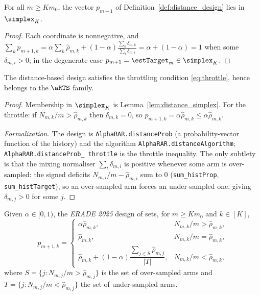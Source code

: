 \begin{lemma}\label{lem:distance_simplex}
\leanok
{}
For all $m \ge K m_0$, the vector $p_{m+1}$ of Definition~\ref{def:distance_design}
lies in $\simplex_K$.
\end{lemma}

\begin{proof}\leanok
Each coordinate is nonnegative, and
$\sum_k p_{m+1,k} = \alpha \sum_k \hat{\rho}_{m,k}
 + (1-\alpha)\frac{\sum_k \delta_{m,k}}{\sum_i \delta_{m,i}} = \alpha + (1-\alpha) = 1$
when some $\delta_{m,i}>0$; in the degenerate case $p_{m+1}=\estTarget_m \in \simplex_K$.
\end{proof}

\begin{lemma}\label{lem:distance_isARTS}
\leanok
{}
The distance-based design satisfies the throttling condition \eqref{eq:throttle},
hence belongs to the $\aRTS$ family.
\end{lemma}

\begin{proof}\leanok
{}
Membership in $\simplex_K$ is Lemma~\ref{lem:distance_simplex}. For the throttle:
if $N_{m,k}/m > \hat{\rho}_{m,k}$ then $\delta_{m,k} = 0$, so
$p_{m+1,k} = \alpha\hat{\rho}_{m,k} \le \alpha \hat{\rho}_{m,k}$.

\emph{Formalization.} The design is \texttt{AlphaRAR.distanceProb} (a probability-vector function of
the history) and the algorithm \texttt{AlphaRAR.distanceAlgorithm}; \texttt{AlphaRAR.distanceProb\_%
throttle} is the throttle inequality. The only subtlety is that the mixing normaliser $\sum_i
\delta_{m,i}$ is positive whenever some arm is over-sampled: the signed deficits
$N_{m,i}/m - \hat\rho_{m,i}$ sum to $0$ (\texttt{sum\_histProp}, \texttt{sum\_histTarget}), so an
over-sampled arm forces an under-sampled one, giving $\delta_{m,j}>0$ for some $j$.
\end{proof}

\begin{definition}\label{def:erade2025}
\leanok
{}
Given $\alpha \in [0,1)$, the \emph{ERADE 2025} design of
\cite{alkhnefr2025efficient} sets, for $m \ge K m_0$ and $k \in [K]$,
\[
  p_{m+1,k} =
  \begin{cases}
    \alpha \hat{\rho}_{m,k}, & N_{m,k}/m > \hat{\rho}_{m,k},\\
    \hat{\rho}_{m,k}, & N_{m,k}/m = \hat{\rho}_{m,k},\\
    \hat{\rho}_{m,k} + (1-\alpha)\dfrac{\sum_{j\in S}\hat{\rho}_{m,j}}{|T|},
      & N_{m,k}/m < \hat{\rho}_{m,k},
  \end{cases}
\]
where $S = \{ j : N_{m,j}/m > \hat{\rho}_{m,j}\}$ is the set of over-sampled arms
and $T = \{ j : N_{m,j}/m < \hat{\rho}_{m,j}\}$ the set of under-sampled arms.
\end{definition}

